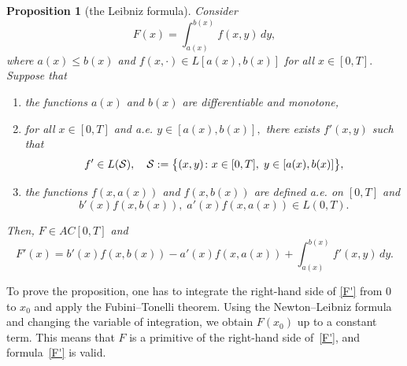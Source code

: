 \documentclass[a4paper, 12pt] {article}
\theoremstyle{plain}
\newtheorem{proposition}{\indent Proposition}
\theoremstyle{remark}
\theoremstyle{plain}
\theoremstyle{definition}
\numberwithin{equation}{section}
\begin{document}
\begin{proposition}[the Leibniz formula]
\label{leib}
Consider
$$F(x) = \int_{a(x)}^{b(x)} f(x, y) \, dy,$$
where $a(x) \le b(x)$ and $f(x, \cdot) \in L[a(x), b(x)]$ for all $x \in [0, T].$
Suppose that
\begin{enumerate}
\item[1)] the functions $a(x)$ and $b(x)$ are differentiable and monotone,
\item[2)] for all $x \in [0, T]$ and a.e. $y \in [a(x), b(x)],$ there exists $f'(x,y)$ such that
$$f' \in L({\cal S}), \quad {\cal S} := \big\{ (x, y) \colon x \in [0, T], \; y \in [a(x), b(x)]\big\},$$
\item[3)] the functions $f(x, a(x))$ and $f(x, b(x))$ are defined a.e. on $[0, T]$ and
$$b'(x) f(x, b(x)), \; a'(x)f(x, a(x)) \in L(0, T).$$
\end{enumerate}
Then, $F \in AC[0, T]$ and
\begin{equation} \label{F'}
F'(x) = b'(x) f(x, b(x)) - a'(x) f(x, a(x)) + \int_{a(x)}^{b(x)} f'(x, y) \, dy.
\end{equation}
\end{proposition}
To prove the proposition, one has to integrate the right-hand side of \eqref{F'} from $0$ to $x_0$ and apply the Fubini--Tonelli theorem. Using the Newton--Leibniz formula and changing the variable of integration, we obtain $F(x_0)$ up to a constant term. This means that $F$ is a primitive of the right-hand side of~\eqref{F'}, and formula~\eqref{F'} is valid.
\end{document}

